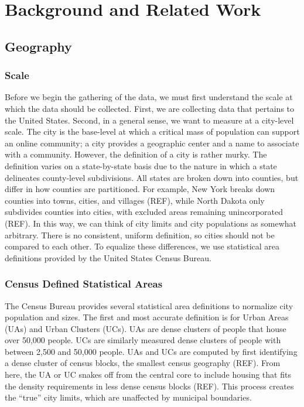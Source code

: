 \documentclass[12pt,oneside, letterpaper]{book}
\begin{document}
\chapter{Background and Related Work}

\section{Geography}

\subsection{Scale}

\par Before we begin the gathering of the data, we must first understand the scale at which the data should be collected. First, we are collecting data that pertains to the United States. Second, in a general sense, we want to measure at a city-level scale. The city is the base-level at which a critical mass of population can support an online community; a city provides a geographic center and a name to associate with a community. However, the definition of a city is rather murky. The definition varies on a state-by-state basis due to the nature in which a state delineates county-level subdivisions. All states are broken down into counties, but differ in how counties are partitioned. For example, New York breaks down counties into towns, cities, and villages (REF), while North Dakota only subdivides counties into cities, with excluded areas remaining unincorporated (REF). In this way, we can think of city limits and city populations as somewhat arbitrary. There is no consistent, uniform definition, so cities should not be compared to each other. To equalize these differences, we use statistical area definitions provided by the United States Census Bureau.

\subsection{Census Defined Statistical Areas}

\par The Census Bureau provides several statistical area definitions to normalize city population and sizes. The first and most accurate definition is for Urban Areas (UAs) and Urban Clusters (UCs). UAs are dense clusters of people that house over 50,000 people. UCs are similarly measured dense clusters of people with between 2,500 and 50,000 people. UAs and UCs are computed by first identifying a dense cluster of census blocks, the smallest census geography (REF). From here, the UA or UC snakes off from the central core to include housing that fits the density requirements in less dense census blocks (REF). This process creates the ``true'' city limits, which are unaffected by municipal boundaries.
\end{document}

